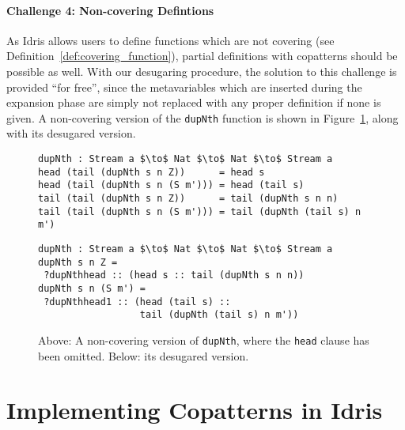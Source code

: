 \paragraph{Challenge 4: Non-covering Defintions} As Idris allows users to
define functions which are not covering (see
Definition~\ref{def:covering_function}), partial definitions with copatterns
should be possible as well. With our desugaring procedure, the solution to this
challenge is provided ``for free'', since the metavariables which are inserted
during the expansion phase are simply not replaced with any proper definition if
none is given. A non-covering version of the \texttt{dupNth} function is shown
in Figure~\ref{fig:dupNth_partial}, along with its desugared version.

\begin{figure}
\begin{lstlisting}[mathescape,title=\idrisBlock]
dupNth : Stream a $\to$ Nat $\to$ Nat $\to$ Stream a
head (tail (dupNth s n Z))      = head s
head (tail (dupNth s n (S m'))) = head (tail s)
tail (tail (dupNth s n Z))      = tail (dupNth s n n)
tail (tail (dupNth s n (S m'))) = tail (dupNth (tail s) n m')
\end{lstlisting}
\begin{lstlisting}[mathescape,title=\idrisBlock]
dupNth : Stream a $\to$ Nat $\to$ Nat $\to$ Stream a
dupNth s n Z = 
 ?dupNthhead :: (head s :: tail (dupNth s n n))
dupNth s n (S m') = 
 ?dupNthhead1 :: (head (tail s) :: 
                  tail (dupNth (tail s) n m'))
\end{lstlisting}

  \caption{Above: A non-covering version of \texttt{dupNth}, where the \texttt{head}
    clause has been omitted. Below: its desugared version.}
  \label{fig:dupNth_partial}
\end{figure}


\section{Implementing Copatterns in Idris}


